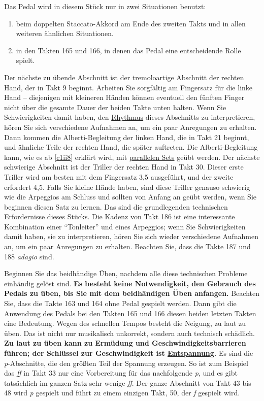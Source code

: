 Das Pedal wird in diesem Stück nur in zwei Situationen benutzt:

\begin{enumerate} 
 \item beim doppelten Staccato-Akkord am Ende des zweiten Takts und in allen weiteren ähnlichen Situationen.
 \item in den Takten 165 und 166, in denen das Pedal eine entscheidende Rolle spielt.
\end{enumerate}
Der nächste zu übende Abschnitt ist der tremoloartige Abschnitt der rechten Hand, der in Takt 9 beginnt.
Arbeiten Sie sorgfältig am Fingersatz für die linke Hand -- diejenigen mit kleineren Händen können eventuell den fünften Finger nicht über die gesamte Dauer der beiden Takte unten halten.
Wenn Sie Schwierigkeiten damit haben, den \hyperref[c1iii1b]{Rhythmus} dieses Abschnitts zu interpretieren, hören Sie sich verschiedene Aufnahmen an, um ein paar Anregungen zu erhalten.
Dann kommen die Alberti-Begleitung der linken Hand, die in Takt 21 beginnt, und ähnliche Teile der rechten Hand, die später auftreten.
Die Alberti-Begleitung kann, wie es ab \hyperref[c1ii8]{\autoref{c1ii8}} erklärt wird, mit \hyperref[c1iii7b]{parallelen Sets} geübt werden.
Der nächste schwierige Abschnitt ist der Triller der rechten Hand in Takt 30.
Dieser erste Triller wird am besten mit dem Fingersatz 3,5 ausgeführt, und der zweite erfordert 4,5.
Falls Sie kleine Hände haben, sind diese Triller genauso schwierig wie die Arpeggios am Schluss und sollten von Anfang an geübt werden, wenn Sie beginnen diesen Satz zu lernen.
Das sind die grundlegenden technischen Erfordernisse dieses Stücks.
Die Kadenz von Takt 186 ist eine interessante Kombination einer \enquote{Tonleiter} und eines Arpeggios; wenn Sie Schwierigkeiten damit haben, sie zu interpretieren, hören Sie sich wieder verschiedene Aufnahmen an, um ein paar Anregungen zu erhalten.
Beachten Sie, dass die Takte 187 und 188 \textit{adagio} sind.

Beginnen Sie das beidhändige Üben, nachdem alle diese technischen Probleme einhändig gelöst sind.
\textbf{Es besteht keine Notwendigkeit, den Gebrauch des Pedals zu üben, bis Sie mit dem beidhändigen Üben anfangen.}
Beachten Sie, dass die Takte 163 und 164 ohne Pedal gespielt werden.
Dann gibt die Anwendung des Pedals bei den Takten 165 und 166 diesen beiden letzten Takten eine Bedeutung.
Wegen des schnellen Tempos besteht die Neigung, zu laut zu üben.
Das ist nicht nur musikalisch unkorrekt, sondern auch technisch schädlich.
\textbf{Zu laut zu üben kann zu Ermüdung und Geschwindigkeitsbarrieren führen; der Schlüssel zur Geschwindigkeit ist \hyperref[c1ii14]{Entspannung}.}
Es sind die \textit{p}-Abschnitte, die den größten Teil der Spannung erzeugen.
So ist zum Beispiel das \textit{ff} in Takt 33 nur eine Vorbereitung für das nachfolgende \textit{p}, und es gibt tatsächlich im ganzen Satz sehr wenige \textit{ff}.
Der ganze Abschnitt von Takt 43 bis 48 wird \textit{p} gespielt und führt zu einem einzigen Takt, 50, der \textit{f} gespielt wird.

